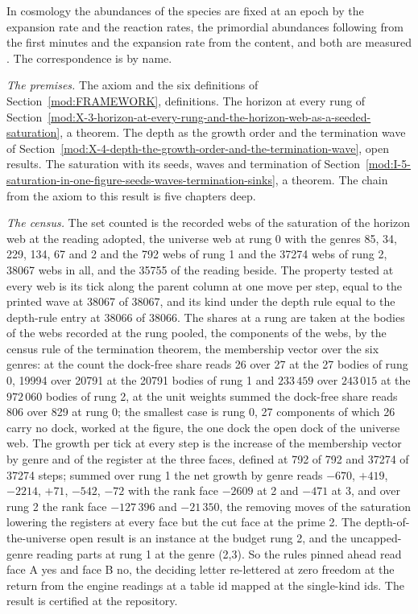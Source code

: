 \begin{chbridge}
In cosmology the abundances of the species are fixed at an epoch by the expansion rate and the reaction rates, the primordial abundances following from the first minutes and the expansion rate from the content, and both are measured \cite{Alpher1948,Hubble1929,Friedmann1922}. The correspondence is by name.
\end{chbridge}
\begin{chproof}
\textit{The premises.} The axiom and the six definitions of Section~\ref{mod:FRAMEWORK}, definitions. The horizon at every rung of Section~\ref{mod:X-3-horizon-at-every-rung-and-the-horizon-web-as-a-seeded-saturation}, a theorem. The depth as the growth order and the termination wave of Section~\ref{mod:X-4-depth-the-growth-order-and-the-termination-wave}, open results. The saturation with its seeds, waves and termination of Section~\ref{mod:I-5-saturation-in-one-figure-seeds-waves-termination-sinks}, a theorem. The chain from the axiom to this result is five chapters deep.

\textit{The census.} The set counted is the recorded webs of the saturation of the horizon web at the reading adopted, the universe web at rung 0 with the genres 85, 34, 229, 134, 67 and 2 and the 792 webs of rung 1 and the 37274 webs of rung 2, 38067 webs in all, and the 35755 of the reading beside. The property tested at every web is its tick along the parent column at one move per step, equal to the printed wave at 38067 of 38067, and its kind under the depth rule equal to the depth-rule entry at 38066 of 38066. The shares at a rung are taken at the bodies of the webs recorded at the rung pooled, the components of the webs, by the census rule of the termination theorem, the membership vector over the six genres: at the count the dock-free share reads 26 over 27 at the 27 bodies of rung 0, 19994 over 20791 at the 20791 bodies of rung 1 and $233\,459$ over $243\,015$ at the $972\,060$ bodies of rung 2, at the unit weights summed the dock-free share reads 806 over 829 at rung 0; the smallest case is rung 0, 27 components of which 26 carry no dock, worked at the figure, the one dock the open dock of the universe web. The growth per tick at every step is the increase of the membership vector by genre and of the register at the three faces, defined at 792 of 792 and 37274 of 37274 steps; summed over rung 1 the net growth by genre reads $-670$, $+419$, $-2214$, $+71$, $-542$, $-72$ with the rank face $-2609$ at 2 and $-471$ at 3, and over rung 2 the rank face $-127\,396$ and $-21\,350$, the removing moves of the saturation lowering the registers at every face but the cut face at the prime 2. The depth-of-the-universe open result is an instance at the budget rung 2, and the uncapped-genre reading parts at rung 1 at the genre (2,3). So the rules pinned ahead read face A yes and face B no, the deciding letter re-lettered at zero freedom at the return from the engine readings at a table id mapped at the single-kind ids. The result is certified at the repository.


\end{chproof}
